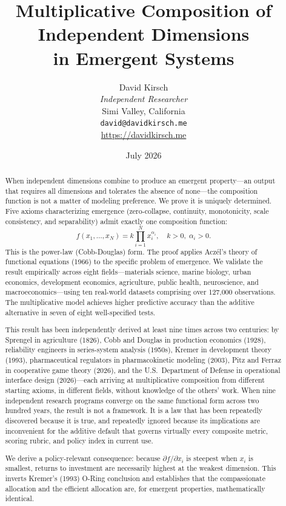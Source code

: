 \documentclass[12pt, a4paper]{article}
\title{\textbf{Multiplicative Composition of Independent Dimensions\\ in Emergent Systems}}
\author{David Kirsch\\
\textit{Independent Researcher}\\
Simi Valley, California\\
\texttt{david@davidkirsch.me}\\
\url{https://davidkirsch.me}}
\date{July 2026}
\theoremstyle{definition}
\theoremstyle{remark}
\begin{document}
\maketitle

\begin{abstract}
When independent dimensions combine to produce an emergent property---an output that requires all dimensions and tolerates the absence of none---the composition function is not a matter of modeling preference. We prove it is uniquely determined. Five axioms characterizing emergence (zero-collapse, continuity, monotonicity, scale consistency, and separability) admit exactly one composition function:
\[
f(x_1, \ldots, x_N) = k \prod_{i=1}^{N} x_i^{\alpha_i}, \quad k > 0, \; \alpha_i > 0.
\]
This is the power-law (Cobb-Douglas) form. The proof applies Acz\'el's theory of functional equations (1966) to the specific problem of emergence. We validate the result empirically across eight fields---materials science, marine biology, urban economics, development economics, agriculture, public health, neuroscience, and macroeconomics---using ten real-world datasets comprising over 127,000 observations. The multiplicative model achieves higher predictive accuracy than the additive alternative in seven of eight well-specified tests.

This result has been independently derived at least nine times across two centuries: by Sprengel in agriculture (1826), Cobb and Douglas in production economics (1928), reliability engineers in series-system analysis (1950s), Kremer in development theory (1993), pharmaceutical regulators in pharmacokinetic modeling (2003), Pitz and Ferraz in cooperative game theory (2026), and the U.S.\ Department of Defense in operational interface design (2026)---each arriving at multiplicative composition from different starting axioms, in different fields, without knowledge of the others' work. When nine independent research programs converge on the same functional form across two hundred years, the result is not a framework. It is a law that has been repeatedly discovered because it is true, and repeatedly ignored because its implications are inconvenient for the additive default that governs virtually every composite metric, scoring rubric, and policy index in current use.

We derive a policy-relevant consequence: because $\partial f / \partial x_i$ is steepest when $x_i$ is smallest, returns to investment are necessarily highest at the weakest dimension. This inverts Kremer's (1993) O-Ring conclusion and establishes that the compassionate allocation and the efficient allocation are, for emergent properties, mathematically identical.
\end{abstract}
\end{document}

